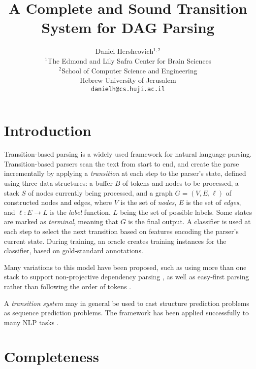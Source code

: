 \documentclass[11pt,a4paper]{article}
\title{A Complete and Sound Transition System for DAG Parsing}
\author{Daniel Hershcovich$^{1,2}$ \\
  $^1$The Edmond and Lily Safra Center for Brain Sciences \\
  $^2$School of Computer Science and Engineering \\
  Hebrew University of Jerusalem \\
  \texttt{danielh@cs.huji.ac.il}
}
\date{}
\begin{document}
\maketitle

\begin{abstract}
\end{abstract}


\section{Introduction}\label{sec:introduction}

Transition-based parsing is a widely used framework for natural language parsing.
Transition-based parsers scan the text from start to end,
and create the parse incrementally by applying a \textit{transition}
at each step to the parser's state,
defined using three data structures: a buffer $B$ of tokens and nodes to be processed,
a stack $S$ of nodes currently being processed,
and a graph $G=(V,E,\ell)$ of constructed nodes and edges,
where $V$ is the set of \emph{nodes}, $E$ is the set of \emph{edges},
and $\ell : E \to L$ is the \emph{label} function, $L$ being the set of possible labels.
Some states are marked as \textit{terminal}, meaning that $G$ is the final output.
A classifier is used at each step to select the next transition based on features
encoding the parser's current state.
During training, an oracle creates training instances for the classifier,
based on gold-standard annotations.

Many variations to this model have been proposed, such as using more than one stack to support
non-projective dependency parsing \cite{gomez2010a},
as well as easy-first parsing rather than following the order of tokens \cite{goldberg2010efficient}.

A \textit{transition system} \cite{Nivr:06} may in general be used to cast structure prediction
problems as sequence prediction problems.
The framework has been applied successfully to many NLP tasks
\cite[][among others]{lample-EtAl:2016:N16-1,kiperwasser2016simple,zhang-zhang-fu:2016:P16-1,kong2017dragnn,hershcovich2017a}.


\section{Completeness}\label{sec:completeness}
\end{document}
